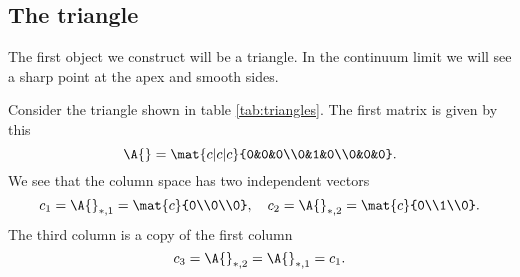 \subsection{The triangle}
The first object we construct will be a triangle. In the continuum limit we will see a sharp point at the apex and smooth sides.

Consider the triangle shown in table \eqref{tab:triangles}. The first matrix is given by this
\begin{equation}
  \A{} = \mat{c|c|c}{0&0&0\\0&1&0\\0&0&0}.
\end{equation}
We see that the column space has two independent vectors
\begin{equation}
  c_{1} = \A{}_{*,1} = \mat{c}{0\\0\\0}, \quad c_{2} = \A{}_{*,2} = \mat{c}{0\\1\\0}.
\end{equation}
The third column is a copy of the first column
\begin{equation}
  c_{3} = \A{}_{*,2} = \A{}_{*,1} = c_{1}.
\end{equation}

